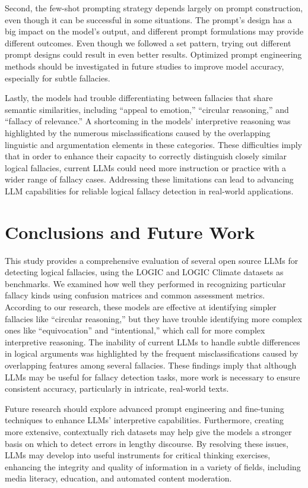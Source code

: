 \documentclass[runningheads]{llncs}
\begin{document}
Second, the few-shot prompting strategy depends largely on prompt construction, even though it can be successful in some situations. The prompt's design has a big impact on the model's output, and different prompt formulations may provide different outcomes. Even though we followed a set pattern, trying out different prompt designs could result in even better results. Optimized prompt engineering methods should be investigated in future studies to improve model accuracy, especially for subtle fallacies.

Lastly, the models had trouble differentiating between fallacies that share semantic similarities, including ``appeal to emotion,'' ``circular reasoning,'' and ``fallacy of relevance.'' A shortcoming in the models' interpretive reasoning was highlighted by the numerous misclassifications caused by the overlapping linguistic and argumentation elements in these categories. These difficulties imply that in order to enhance their capacity to correctly distinguish closely similar logical fallacies, current LLMs could need more instruction or practice with a wider range of fallacy cases. Addressing these limitations can lead to advancing LLM capabilities for reliable logical fallacy detection in real-world applications.

\section{Conclusions and Future Work}
This study provides a comprehensive evaluation of several open source LLMs for detecting logical fallacies, using the LOGIC and LOGIC Climate datasets as benchmarks. We examined how well they performed in recognizing particular fallacy kinds using confusion matrices and common assessment metrics. According to our research, these models are effective at identifying simpler fallacies like ``circular reasoning,'' but they have trouble identifying more complex ones like ``equivocation'' and ``intentional,'' which call for more complex interpretive reasoning. The inability of current LLMs to handle subtle differences in logical arguments was highlighted by the frequent misclassifications caused by overlapping features among several fallacies. These findings imply that although LLMs may be useful for fallacy detection tasks, more work is necessary to ensure consistent accuracy, particularly in intricate, real-world texts. 

Future research should explore advanced prompt engineering and fine-tuning techniques to enhance LLMs’ interpretive capabilities. Furthermore, creating more extensive, contextually rich datasets may help give the models a stronger basis on which to detect errors in lengthy discourse. By resolving these issues, LLMs may develop into useful instruments for critical thinking exercises, enhancing the integrity and quality of information in a variety of fields, including media literacy, education, and automated content moderation. 
\end{document}

